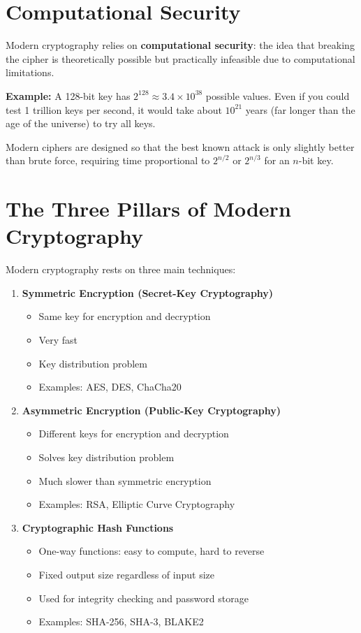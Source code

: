 \documentclass[11pt,a4paper]{report}
\begin{document}
\section{Computational Security}

Modern cryptography relies on \textbf{computational security}: the idea that breaking the cipher is theoretically possible but practically infeasible due to computational limitations.

\textbf{Example:} A 128-bit key has $2^{128} \approx 3.4 \times 10^{38}$ possible values. Even if you could test 1 trillion keys per second, it would take about $10^{21}$ years (far longer than the age of the universe) to try all keys.

Modern ciphers are designed so that the best known attack is only slightly better than brute force, requiring time proportional to $2^{n/2}$ or $2^{n/3}$ for an $n$-bit key.

\section{The Three Pillars of Modern Cryptography}

Modern cryptography rests on three main techniques:

\begin{enumerate}
\item \textbf{Symmetric Encryption (Secret-Key Cryptography)}
   \begin{itemize}
   \item Same key for encryption and decryption
   \item Very fast
   \item Key distribution problem
   \item Examples: AES, DES, ChaCha20
   \end{itemize}

\item \textbf{Asymmetric Encryption (Public-Key Cryptography)}
   \begin{itemize}
   \item Different keys for encryption and decryption
   \item Solves key distribution problem
   \item Much slower than symmetric encryption
   \item Examples: RSA, Elliptic Curve Cryptography
   \end{itemize}

\item \textbf{Cryptographic Hash Functions}
   \begin{itemize}
   \item One-way functions: easy to compute, hard to reverse
   \item Fixed output size regardless of input size
   \item Used for integrity checking and password storage
   \item Examples: SHA-256, SHA-3, BLAKE2
   \end{itemize}
\end{enumerate}
\end{document}
